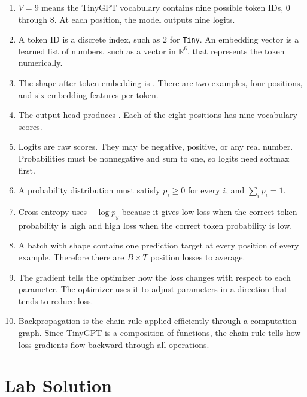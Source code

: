 \begin{enumerate}
  \item \(V=9\) means the TinyGPT vocabulary contains nine possible token IDs, \(0\) through \(8\). At each position, the model outputs nine logits.

  \item A token ID is a discrete index, such as \(2\) for \texttt{Tiny}. An embedding vector is a learned list of numbers, such as a vector in \(\mathbb{R}^{6}\), that represents the token numerically.

  \item The shape after token embedding is \shape{[2,4,6]}. There are two examples, four positions, and six embedding features per token.

  \item The output head produces \shape{[2,4,9]}. Each of the eight positions has nine vocabulary scores.

  \item Logits are raw scores. They may be negative, positive, or any real number. Probabilities must be nonnegative and sum to one, so logits need softmax first.

  \item A probability distribution must satisfy \(p_i\geq 0\) for every \(i\), and \(\sum_i p_i=1\).

  \item Cross entropy uses \(-\log p_y\) because it gives low loss when the correct token probability is high and high loss when the correct token probability is low.

  \item A batch with shape \shape{[B,T]} contains one prediction target at every position of every example. Therefore there are \(B\times T\) position losses to average.

  \item The gradient tells the optimizer how the loss changes with respect to each parameter. The optimizer uses it to adjust parameters in a direction that tends to reduce loss.

  \item Backpropagation is the chain rule applied efficiently through a computation graph. Since TinyGPT is a composition of functions, the chain rule tells how loss gradients flow backward through all operations.
\end{enumerate}

\section{Lab Solution}

